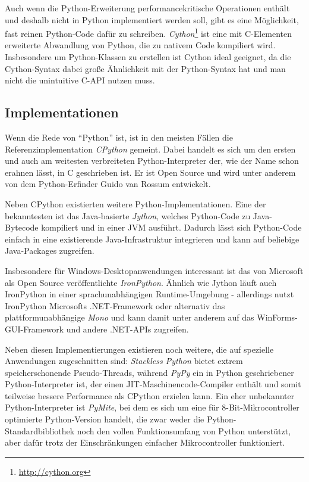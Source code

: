 

Auch wenn die Python-Erweiterung performancekritische Operationen enthält und deshalb nicht in
Python implementiert werden soll, gibt es eine Möglichkeit, fast reinen Python-Code dafür zu
schreiben. \emph{Cython}\footnote{\href{http://cython.org}{http://cython.org}} ist eine mit
C-Elementen erweiterte Abwandlung von Python, die zu nativem Code kompiliert wird. Insbesondere um
Python-Klassen zu erstellen ist Cython ideal geeignet, da die Cython-Syntax dabei große Ähnlichkeit
mit der Python-Syntax hat und man nicht die unintuitive C-API nutzen muss.


\subsection{Implementationen}

Wenn die Rede von \enquote{Python} ist, ist in den meisten Fällen die Referenzimplementation
\emph{CPython} gemeint. Dabei handelt es sich um den ersten und auch am weitesten verbreiteten
Python-Interpreter der, wie der Name schon erahnen lässt, in C geschrieben ist. Er ist Open Source
und wird unter anderem von dem Python-Erfinder Guido van Rossum entwickelt.

Neben CPython existierten weitere Python-Implementationen. Eine der bekanntesten ist das
Java-basierte \emph{Jython}, welches Python-Code zu Java-Bytecode kompiliert und in einer JVM
ausführt. Dadurch lässt sich Python-Code einfach in eine existierende Java-Infrastruktur integrieren
und kann auf beliebige Java-Packages zugreifen.

Insbesondere für Windows-Desktopanwendungen interessant ist das von Microsoft als Open Source
veröffentlichte \emph{IronPython}. Ähnlich wie Jython läuft auch IronPython in einer
sprachunabhängigen Runtime-Umgebung - allerdings nutzt IronPython Microsofts .NET-Framework oder
alternativ das plattformunabhängige \emph{Mono} und kann damit unter anderem auf das
WinForms-GUI-Framework und andere .NET-APIs zugreifen.

Neben diesen Implementierungen existieren noch weitere, die auf spezielle Anwendungen zugeschnitten
sind: \emph{Stackless Python} bietet extrem speicherschonende Pseudo-Threads, während \emph{PyPy}
ein in Python geschriebener Python-Interpreter ist, der einen
JIT-Maschinencode-Compiler enthält und somit teilweise bessere Performance als CPython erzielen
kann. Ein eher unbekannter Python-Interpreter ist \emph{PyMite}, bei dem es sich um eine für
8-Bit-Mikrocontroller optimierte Python-Version handelt, die zwar weder die
Python-Standardbibliothek noch den vollen Funktionsumfang von Python unterstützt, aber dafür trotz
der Einschränkungen einfacher Mikrocontroller funktioniert.


